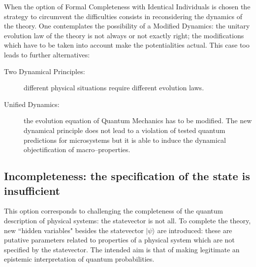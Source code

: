 \documentclass[12pt]{article}
\begin{document}
When the option of Formal Completeness with Identical Individuals
is chosen the strategy to circumvent the difficulties consists in
reconsidering the dynamics of the theory. One contemplates the
possibility of a Modified Dynamics: the unitary evolution law of
the theory is not always or not exactly right; the modifications
which have to be taken into account make the potentialities
actual. This case too leads to further alternatives:
\begin{description}
\item[Two Dynamical Principles:] different physical situations
require different evolution laws.
\item[Unified Dynamics:] the evolution equation of Quantum
Mechanics has to be modified. The new dynamical principle does not
lead to a violation of tested quantum predictions for microsystems
but it is able to induce the dynamical objectification of
macro--properties.
\end{description}


\subsection{Incompleteness: the specification of the state is
insufficient} \label{sec32}

This option corresponds to challenging the completeness of the
quantum description of physical systems: the statevector is not
all. To complete the theory, new ``hidden variables" besides the
statevector $|\psi\rangle$ are introduced: these are putative
parameters related to properties of a physical system which are
not specified by the statevector. The intended aim is that of
making legitimate an epistemic interpretation of quantum
probabilities.
\end{document}
